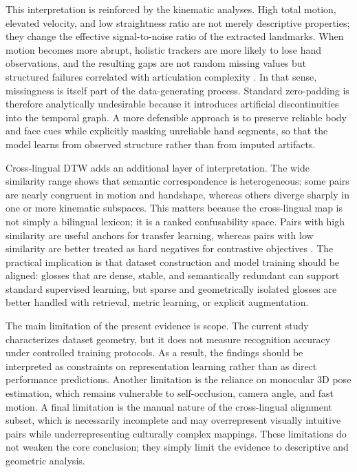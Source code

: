 \documentclass{ieeeaccess}
\begin{document}
This interpretation is reinforced by the kinematic analyses. High total motion, elevated velocity, and low straightness ratio are not merely descriptive properties; they change the effective signal-to-noise ratio of the extracted landmarks. When motion becomes more abrupt, holistic trackers are more likely to lose hand observations, and the resulting gaps are not random missing values but structured failures correlated with articulation complexity \cite{lugaresi2019mediapipe}. In that sense, missingness is itself part of the data-generating process. Standard zero-padding is therefore analytically undesirable because it introduces artificial discontinuities into the temporal graph. A more defensible approach is to preserve reliable body and face cues while explicitly masking unreliable hand segments, so that the model learns from observed structure rather than from imputed artifacts.

Cross-lingual DTW adds an additional layer of interpretation. The wide similarity range shows that semantic correspondence is heterogeneous: some pairs are nearly congruent in motion and handshape, whereas others diverge sharply in one or more kinematic subspaces. This matters because the cross-lingual map is not simply a bilingual lexicon; it is a ranked confusability space. Pairs with high similarity are useful anchors for transfer learning, whereas pairs with low similarity are better treated as hard negatives for contrastive objectives \cite{chen2020simple, robinson2020contrastive}. The practical implication is that dataset construction and model training should be aligned: glosses that are dense, stable, and semantically redundant can support standard supervised learning, but sparse and geometrically isolated glosses are better handled with retrieval, metric learning, or explicit augmentation.

The main limitation of the present evidence is scope. The current study characterizes dataset geometry, but it does not measure recognition accuracy under controlled training protocols. As a result, the findings should be interpreted as constraints on representation learning rather than as direct performance predictions. Another limitation is the reliance on monocular 3D pose estimation, which remains vulnerable to self-occlusion, camera angle, and fast motion. A final limitation is the manual nature of the cross-lingual alignment subset, which is necessarily incomplete and may overrepresent visually intuitive pairs while underrepresenting culturally complex mappings. These limitations do not weaken the core conclusion; they simply limit the evidence to descriptive and geometric analysis.
\end{document}
